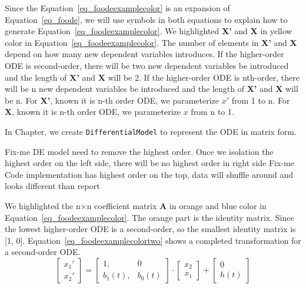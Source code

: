 Since the Equation~\ref{eq_foodeexamplecolor} is an expansion of Equation~\ref{eq_foode}, we will use symbols in both equations to explain how to generate Equation~\ref{eq_foodeexamplecolor}. We highlighted \textbf{X'} and \textbf{X} in yellow color in Equation~\ref{eq_foodeexamplecolor}. The number of elements in \textbf{X'} and \textbf{X} depend on how many new dependent variables introduces. If the higher-order ODE is second-order, there will be two new dependent variables be introduced and the length of \textbf{X'} and \textbf{X} will be 2. If the higher-order ODE is nth-order, there will be n new dependent variables be introduced and the length of \textbf{X'} and \textbf{X} will be n. For \textbf{X'}, known it is n-th order ODE, we parameterize $x'$ from 1 to n. For \textbf{X}, known it is n-th order ODE, we parameterize $x$ from n to 1.

In Chapter, we create \verb|DifferentialModel| to represent the ODE in matrix form. 

Fix-me DE model need to remove the highest order. Once we isolation the highest order on the left side, there will be no highest order in right side
Fix-me Code implementation has highest order on the top, data will shuffle around and looks different than report


We highlighted the n$\times$n coefficient matrix \textbf{A} in orange and blue color in Equation~\ref{eq_foodeexamplecolor}. The orange part is the identity matrix. Since the lowest higher-order ODE is a second-order, so the smallest identity matrix is [1, 0]. Equation~\ref{eq_foodeexamplecolortwo} shows a completed transformation for a second-order ODE.
\begin{equation} \label{eq_foodeexamplecolortwo}
	\begin{bmatrix}
		{x_{1}'} \\
    {x_{2}'} 
	\end{bmatrix}
    = 
  \begin{bmatrix}
		{1}, & {0} \\
    {b_{1}(t)}, & {b_{0}(t)}
	\end{bmatrix}
    \cdot
  \begin{bmatrix}
		{x_{2}} \\
    {x_{1}} 
	\end{bmatrix}
    + 
  \begin{bmatrix}
    {0} \\
    {h(t)}
	\end{bmatrix}
\end{equation}

